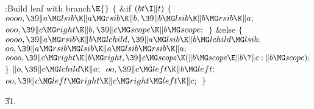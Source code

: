 \B{}:Build leaf with branch\X${}\E{}$\6
${}\{{}$\1\6
\&{if} ${}(\\{bt}\I\|t){}$\5
${}\{{}$\1\6
${}\\{oooo},\39\|a\MG\\{lsib}\K\|a\MG\\{rsib}\K\|b,\39\|b\MG\\{lsib}\K\|b\MG%
\\{rsib}\K\|a;{}$\6
${}\\{ooo},\39\|c\MG\\{right}\K\|b,\39\|c\MG\\{scope}\K\|b\MG\\{scope};{}$\6
\4${}\}{}$\5
\2\&{else}\5
${}\{{}$\1\6
${}\\{oooo},\39\|a\MG\\{rsib}\K\|b\MG\\{lchild},\39\|a\MG\\{lsib}\K\|b\MG%
\\{lchild}\MG\\{lsib};{}$\6
${}\\{oo},\39\|a\MG\\{rsib}\MG\\{lsib}\K\|a\MG\\{lsib}\MG\\{rsib}\K\|a;{}$\6
${}\\{oooo},\39\|c\MG\\{right}\K\|b\MG\\{right},\39\|c\MG\\{scope}\K(\|b\MG%
\\{scope}\E\|b\?\|c:\|b\MG\\{scope});{}$\6
\4${}\}{}$\2\6
${}\|o,\39\|c\MG\\{lchild}\K\|a;{}$\6
${}\\{oo},\39\|c\MG\\{left}\K\|b\MG\\{left};{}$\6
${}\\{oo},\39\|c\MG\\{left}\MG\\{right}\K\|c\MG\\{right}\MG\\{left}\K\|c;{}$\6
\4${}\}{}$\2\par
\U31.\fi

